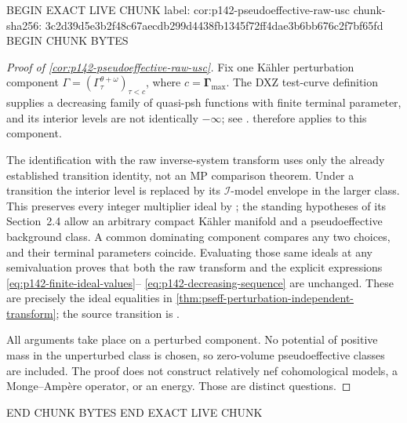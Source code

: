 BEGIN EXACT LIVE CHUNK
label: cor:p142-pseudoeffective-raw-usc
chunk-sha256: 3c2d39d5e3b2f48c67aecdb299d4438fb1345f72ff4dae3b6bb676c2f7bf65fd
BEGIN CHUNK BYTES
\begin{proof}[Proof of \cref{cor:p142-pseudoeffective-raw-usc}]
Fix one K\"ahler perturbation component
$\Gamma=(\Gamma^{\theta+\omega}_\tau)_{\tau<c}$, where
$c=\boldsymbol\Gamma_{\max}$. The DXZ test-curve definition supplies
a decreasing family of quasi-psh functions with finite terminal
parameter, and its interior levels are not identically $-\infty$;
see \cite[Section~2.2, Definition~3.3]{DXZ23}.
 therefore applies to this component.

The identification with the raw inverse-system transform uses only the
already established transition identity, not an MP comparison theorem.
Under a transition the interior level is replaced by its
$\mathcal I$-model envelope in the larger class. This preserves every
integer multiplier ideal by \cite[Proposition~2.18(ii)]{DX22}; the
standing hypotheses of its Section~2.4 allow an arbitrary compact
K\"ahler manifold and a pseudoeffective background class. A common
dominating component compares any
two choices, and their terminal parameters coincide. Evaluating those
same ideals at any semivaluation proves that both the raw transform and
the explicit expressions \eqref{eq:p142-finite-ideal-values}--
\eqref{eq:p142-decreasing-sequence} are unchanged. These are precisely
the ideal equalities in
\cref{thm:pseff-perturbation-independent-transform}; the source
transition is \cite[formula~(28), Definition~3.3]{DXZ23}.

All arguments take place on a perturbed component. No potential of
positive mass in the unperturbed class is chosen, so zero-volume
pseudoeffective classes are included. The proof does not construct
relatively nef cohomological models, a Monge--Amp\`ere operator, or an
energy. Those are distinct questions.
\end{proof}
END CHUNK BYTES
END EXACT LIVE CHUNK
